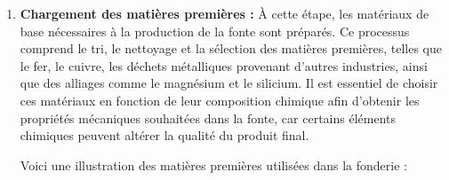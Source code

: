\documentclass[12pt]{article}
\begin{document}
\begin{enumerate}
    \item \textbf{Chargement des matières premières :}
    À cette étape, les matériaux de base nécessaires à la production de la 
    fonte sont préparés. Ce processus comprend le tri, le nettoyage et la 
    sélection des matières premières, telles que le fer, le cuivre, les 
    déchets métalliques provenant d'autres industries, ainsi que des 
    alliages comme le magnésium et le silicium. Il est essentiel de choisir
    ces matériaux en fonction de leur composition chimique afin d'obtenir 
    les propriétés mécaniques souhaitées dans la fonte, car certains 
    éléments chimiques peuvent altérer la qualité du produit final.

    Voici une illustration des matières premières utilisées dans la fonderie :


\end{enumerate}
\end{document}
